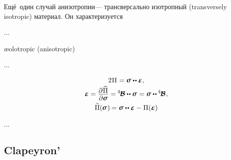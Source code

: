 \begin{otherlanguage}{russian}
Ещё~один случай анизотропии\:--- трансверсально изотропный (transversely isotropic) материал.
Он характеризуется

...

æolotropic (anisotropic)

...

\begin{equation}\label{legendretransformforlinearelasticenergy}
\begin{gathered}
2 \hspace{.1ex} \Pi \hspace{.1ex} = \linearstress \dotdotp \mathboldepsilon
,
\\[-0.2em]
%
\mathboldepsilon = \displaystyle \frac{\raisemath{-0.2em}{\partial\hspace{.1ex} \widehat{\Pi}}}{\raisemath{.04em}{\partial \linearstress}} = \hspace{-0.12ex} \pliabilitytensor \dotdotp \linearstress \hspace{.1ex} = \linearstress \dotdotp \hspace{-0.1ex} \pliabilitytensor
\hspace{.1ex} ,
\\
%
\widehat{\Pi}(\hspace{-0.1ex}\linearstress\hspace{.12ex}) \hspace{-0.1ex}
= \linearstress \dotdotp \mathboldepsilon
- \hspace{.1ex} \Pi(\mathboldepsilon)
\end{gathered}
\end{equation}

...


\end{otherlanguage}



\label{para:theoremsofstatics}

\subsection*{Clapeyron’}

